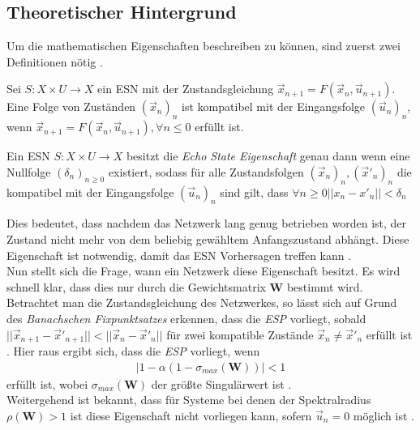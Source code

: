 \subsection{Theoretischer Hintergrund}
\label{sc:theory}
Um die mathematischen Eigenschaften beschreiben zu können, sind zuerst zwei Definitionen nötig \cite{yildiz}.

\begin{definition}
Sei $S : X \times U \rightarrow X$ ein \textsc{ESN} mit der Zustandsgleichung $\vec{x}_{n+1} = F \left( \vec{x}_n, \vec{u}_{n+1} \right)$. Eine Folge von Zuständen $(\vec{x}_n)_n$ ist kompatibel mit der Eingangsfolge $(\vec{u}_n)_n$, wenn $\vec{x}_{n+1} = F\left( \vec{x}_n, \vec{u}_{n+1} \right), \forall n \leq 0$ erfüllt ist.
\end{definition}

\begin{definition}
Ein \textsc{ESN} $S : X \times U \rightarrow X$ besitzt die \textit{Echo State Eigenschaft} genau dann wenn eine Nullfolge $(\delta_n)_{n \geq 0}$ existiert, sodass für alle Zustandsfolgen $(\vec{x}_n)_n, (\vec{x}'_n)_n$ die kompatibel mit der Eingangsfolge $(\vec{u}_n)_n$ sind gilt, dass $\forall n \geq 0 ||x_n - x'_n|| < \delta_n$
\end{definition} 
Dies bedeutet, dass nachdem das Netzwerk lang genug betrieben worden ist, der Zustand nicht mehr von dem beliebig gewähltem Anfangszustand abhängt. Diese Eigenschaft ist notwendig, damit das \textsc{ESN} Vorhersagen treffen kann \cite{jeagerTut2002}.\\

Nun stellt sich die Frage, wann ein Netzwerk diese Eigenschaft besitzt. Es wird schnell klar, dass dies nur durch die Gewichtsmatrix $\mathbf{W}$ bestimmt wird. Betrachtet man die Zustandsgleichung des Netzwerkes, so lässt sich auf Grund des \textit{Banachschen Fixpunktsatzes} erkennen, dass die \textit{ESP} vorliegt, sobald $||\vec{x}_{n+1} - \vec{x}'_{n+1}|| < ||\vec{x}_n - \vec{x}'_n||$ für zwei kompatible Zustände $\vec{x}_n \neq \vec{x}'_n$ erfüllt ist \cite{jaeger2010}.
Hier raus ergibt sich, dass die \textit{ESP} vorliegt, wenn 
\begin{align}
\label{eq:theory_old_requirement}
|1-\alpha(1-\sigma_{max}(\mathbf{W}))| < 1
\end{align}
erfüllt ist, wobei $\sigma_{max}(\mathbf{W})$ der größte Singulärwert ist \cite{jaeger2007}.\\
Weitergehend ist bekannt, dass für Systeme bei denen der Spektralradius $\rho(\mathbf{W}) > 1$ ist diese Eigenschaft nicht vorliegen kann, sofern $\vec{u}_n = 0$ möglich ist \cite{jaeger2007, jaeger2010}.\\

